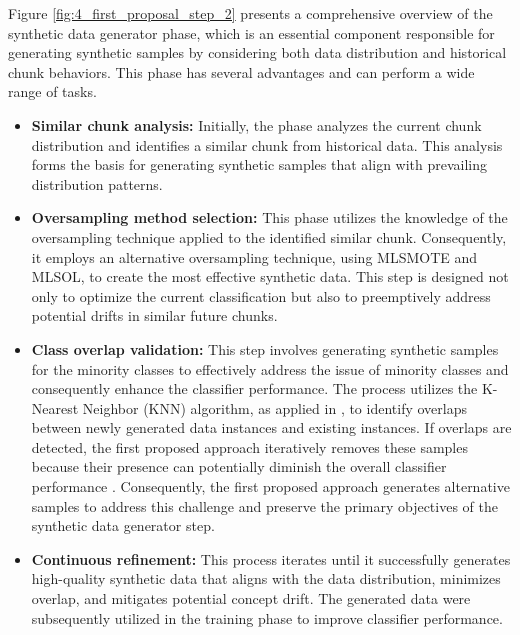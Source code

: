 Figure \ref{fig:4_first_proposal_step_2} presents a comprehensive overview of the synthetic data generator phase, which is an essential component responsible for generating synthetic samples by considering both data distribution and historical chunk behaviors. This phase has several advantages and can perform a wide range of tasks.
\begin{itemize}
	\item \textbf{Similar chunk analysis:} Initially, the phase analyzes the current chunk distribution and identifies a similar chunk from historical data. This analysis forms the basis for generating synthetic samples that align with prevailing distribution patterns.
	\item \textbf{Oversampling method selection:} This phase utilizes the knowledge of the oversampling technique applied to the identified similar chunk. Consequently, it employs an alternative oversampling technique, using MLSMOTE and MLSOL, to create the most effective synthetic data. This step is designed not only to optimize the current classification but also to preemptively address potential drifts in similar future chunks.
	\item \textbf{Class overlap validation:} This step involves generating synthetic samples for the minority classes to effectively address the issue of minority classes and consequently enhance the classifier performance. The process utilizes the K-Nearest Neighbor (KNN) algorithm, as applied in \cite{lu2016concept}, to identify overlaps between newly generated data instances and existing instances. If overlaps are detected, the first proposed approach iteratively removes these samples because their presence can potentially diminish the overall classifier performance \cite{cruz2017meta, widmer1996learning}. Consequently, the first proposed approach generates alternative samples to address this challenge and preserve the primary objectives of the synthetic data generator step.
	\item \textbf{Continuous refinement:} This process iterates until it successfully generates high-quality synthetic data that aligns with the data distribution, minimizes overlap, and mitigates potential concept drift. The generated data were subsequently utilized in the training phase to improve classifier performance.
\end{itemize}

